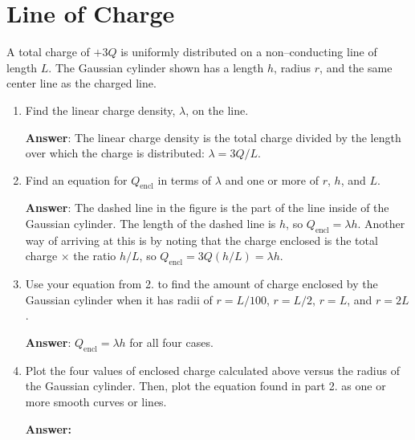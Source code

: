 \documentclass{article}
\begin{document}
\section{Line of Charge}

A total charge of $+3Q$ is uniformly distributed on a non--conducting line of length $L$. The Gaussian cylinder shown has a length $h$, radius $r$, and the same center line as the charged line.



\begin{enumerate}

  \item Find the linear charge density, $\lambda$, on the line.

        \ifsolutions
        {\bf Answer}: The linear charge density is the total charge divided by the length over which the charge is distributed: $\lambda={3Q}/{L}$.
        \fi

        \ifsolutions\else
        \vskip 36pt
        \fi

  \item Find an equation for $Q_{\text{encl}}$ in terms of $\lambda$ and one or more of $r$, $h$, and $L$.

        \ifsolutions
        {\bf Answer}: The dashed line in the figure is the part of the line inside of the Gaussian cylinder. The length of the dashed line is $h$, so $Q_{\text{encl}}=\lambda h$. Another way of arriving at this is by noting that the charge enclosed is the total charge $\times$ the ratio $h/L$, so $Q_{\text{encl}}=3Q(h/L) = \lambda h$.
        \fi

        \ifsolutions\else
        \vskip 36pt
        \fi

  \item Use your equation from 2. to find the amount of charge enclosed by the Gaussian cylinder when it has radii of $r=L/100$, $r=L/2$, $r=L$, and $r=2L$.

        \ifsolutions
        {\bf Answer}: $Q_{\text{encl}}=\lambda h$ for all four cases.
        \fi

        \ifsolutions\else
        \vskip 36pt
        \fi

  \item Plot the four values of enclosed charge calculated above versus the radius of the Gaussian cylinder. Then, plot the equation found in part 2. as one or more smooth curves or lines.

        \ifsolutions
        {\bf Answer:}

        
        \fi

        \ifsolutions\else
        \newpage
        \fi

\end{enumerate}
\end{document}
